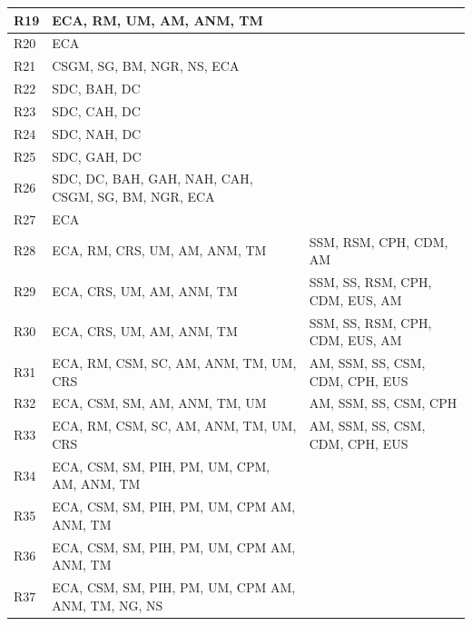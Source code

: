 \documentclass{Configuration_Files/PoliMi3i_thesis}
\begin{document}
\begin{xltabular}{\textwidth}{| >{}l | X | X |}
R19 & ECA, RM, UM, AM, ANM, TM & \B\\
\hline

R20 & ECA & \B\\
\hline

R21 & CSGM, SG, BM, NGR, NS, ECA & \B\\
\hline

R22 & SDC, BAH, DC & \B\\
\hline

R23 & SDC, CAH, DC & \B\\
\hline

R24 & SDC, NAH, DC & \B\\
\hline

R25 & SDC, GAH, DC & \B\\
\hline

R26 & SDC, DC, BAH, GAH, NAH, CAH, CSGM, SG, BM, NGR, ECA & \B\\
\hline

R27 & ECA &\B\\
\hline

R28 & ECA, RM, CRS, UM, AM, ANM, TM & SSM, RSM, CPH, CDM, AM \B\\
\hline

R29 & ECA, CRS, UM, AM, ANM, TM & SSM, SS, RSM, CPH, CDM, EUS, AM \B\\
\hline

R30 & ECA, CRS, UM, AM, ANM, TM & SSM, SS, RSM, CPH, CDM, EUS, AM \B\\
\hline

R31 & ECA, RM, CSM, SC, AM, ANM, TM, UM, CRS & AM, SSM, SS, CSM, CDM, CPH, EUS \B\\
\hline

R32 & ECA, CSM, SM, AM, ANM, TM, UM & AM, SSM, SS, CSM, CPH\B\\
\hline

R33 & ECA, RM, CSM, SC, AM, ANM, TM, UM, CRS & AM, SSM, SS, CSM, CDM, CPH, EUS \B\\
\hline

R34 & ECA, CSM, SM, PIH, PM, UM, CPM, AM, ANM, TM & \B\\
\hline

R35 & ECA, CSM, SM, PIH, PM, UM, CPM AM, ANM, TM & \B\\
\hline

R36 & ECA, CSM, SM, PIH, PM, UM, CPM AM, ANM, TM & \B\\
\hline
    
R37 & ECA, CSM, SM, PIH, PM, UM, CPM AM, ANM, TM, NG, NS & \B\\
\hline
    

\end{xltabular}
\end{document}
